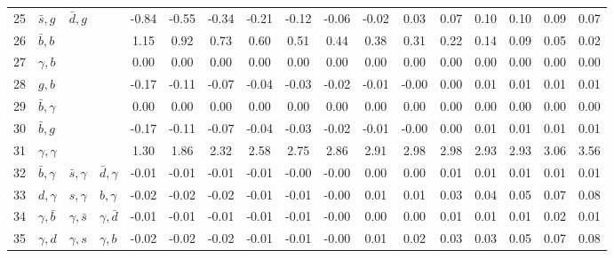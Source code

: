 \begin{tabularx}{\textwidth}{rXXX@{}S@{}S@{}S@{}S@{}S@{}S@{}S@{}S@{}S@{}S@{}S@{}S@{}S}
 25 & $\bar s,g$       & $\bar d, g$      &                 & -0.84 & -0.55 & -0.34 & -0.21 & -0.12 & -0.06 & -0.02 &  0.03 &  0.07 &  0.10 &  0.10 &  0.09 &  0.07 \\
 26 & $\bar b,b$       &                  &                 &  1.15 &  0.92 &  0.73 &  0.60 &  0.51 &  0.44 &  0.38 &  0.31 &  0.22 &  0.14 &  0.09 &  0.05 &  0.02 \\
 27 & $\gamma, b$      &                  &                 &  0.00 &  0.00 &  0.00 &  0.00 &  0.00 &  0.00 &  0.00 &  0.00 &  0.00 &  0.00 &  0.00 &  0.00 &  0.00 \\
 28 & $g,b$            &                  &                 & -0.17 & -0.11 & -0.07 & -0.04 & -0.03 & -0.02 & -0.01 & -0.00 &  0.00 &  0.01 &  0.01 &  0.01 &  0.01 \\
 29 & $\bar b,\gamma$  &                  &                 &  0.00 &  0.00 &  0.00 &  0.00 &  0.00 &  0.00 &  0.00 &  0.00 &  0.00 &  0.00 &  0.00 &  0.00 &  0.00 \\
 30 & $\bar b,g$       &                  &                 & -0.17 & -0.11 & -0.07 & -0.04 & -0.03 & -0.02 & -0.01 & -0.00 &  0.00 &  0.01 &  0.01 &  0.01 &  0.01 \\
 31 & $\gamma,\gamma$  &                  &                 &  1.30 &  1.86 &  2.32 &  2.58 &  2.75 &  2.86 &  2.91 &  2.98 &  2.98 &  2.93 &  2.93 &  3.06 &  3.56 \\
 32 & $\bar b,\gamma$  & $\bar s,\gamma$  & $\bar d,\gamma$ & -0.01 & -0.01 & -0.01 & -0.01 & -0.00 & -0.00 &  0.00 &  0.00 &  0.01 &  0.01 &  0.01 &  0.01 &  0.01 \\
 33 & $d,\gamma$       & $s,\gamma$       & $b,\gamma$      & -0.02 & -0.02 & -0.02 & -0.01 & -0.01 & -0.00 &  0.01 &  0.01 &  0.03 &  0.04 &  0.05 &  0.07 &  0.08 \\
 34 & $\gamma,\bar b$  & $\gamma,\bar s$  & $\gamma,\bar d$ & -0.01 & -0.01 & -0.01 & -0.01 & -0.01 & -0.00 &  0.00 &  0.00 &  0.01 &  0.01 &  0.01 &  0.02 &  0.01 \\
 35 & $\gamma,d$       & $\gamma,s$       & $\gamma, b$     & -0.02 & -0.02 & -0.02 & -0.01 & -0.01 & -0.00 &  0.01 &  0.02 &  0.03 &  0.03 &  0.05 &  0.07 &  0.08 \\
 \bottomrule
\end{tabularx}
